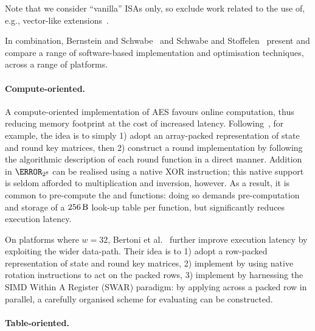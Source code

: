 

Note that we consider ``vanilla'' ISAs only, so exclude work related to the
use of, e.g., vector-like extensions~\cite{Hamburg:09}.

In combination,
Bernstein and   Schwabe~\cite{BerSch:08}
and
Schwabe   and Stoffelen~\cite{SchSto:16}
present and compare a range of software-based implementation and 
optimisation techniques, across a range of platforms.


\paragraph{Compute-oriented.}

A compute-oriented implementation of AES favours
 online     computation, 
thus reducing 
memory footprint
at the cost of increased 
latency.
Following~\cite[Section 4.1]{DaeRij:02}, for example, the idea is to simply
1) adopt an
    array-packed
   representation of state and round key matrices,
   then
2) construct a round implementation by following the algorithmic description
   of each round function in a direct manner.
Addition in $\F_{2^8}$ can be realised using a native XOR instruction; this
native support is seldom afforded to multiplication and inversion, however.
As a result, it is common to pre-compute the  and  
functions:
doing so demands pre-computation and storage of a
$
\SI{256}{\byte}
$
look-up table per function, but significantly reduces execution latency.

On platforms where $w = 32$,
Bertoni et al.~\cite{BBFMM:02}
further improve execution latency by exploiting the wider data-path.  Their
idea is to
1) adopt a 
      row-packed
   representation of state and round key matrices,
2) implement
   by using native rotation instructions to act on the packed
   rows,
3) implement
   by harnessing the SIMD Within A Register (SWAR) paradigm:
   by applying
   across a packed row in parallel,
   a carefully organised scheme for evaluating
   can be constructed.


\paragraph  {Table-oriented.}

